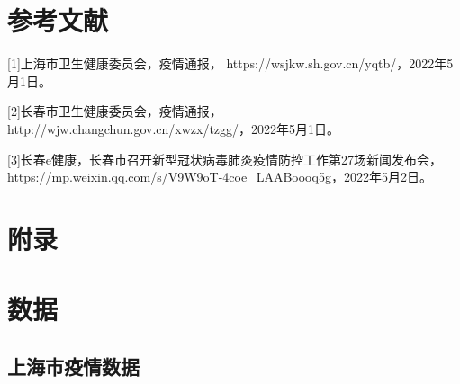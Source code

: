 \documentclass[12pt]{article}
\begin{document}
{\centering\section*{参考文献}}

[1]上海市卫生健康委员会，疫情通报，
https://wsjkw.sh.gov.cn/yqtb/，2022年5月1日。

[2]长春市卫生健康委员会，疫情通报，http://wjw.changchun.gov.cn/xwzx/tzgg/，2022年5月1日。

[3]长春e健康，长春市召开新型冠状病毒肺炎疫情防控工作第27场新闻发布会，https://mp.weixin.qq.com/s/V9W9oT-4coe\_LAABoooq5g，2022年5月2日。

\newpage
\appendix
{\centering\section*{附录}}

\section{数据}

\subsection{上海市疫情数据}
\end{document}
